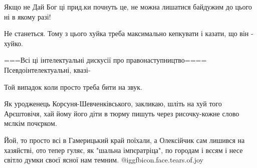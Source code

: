 \begin{itemize}
Якщо не Дай Бог ці прид.ки почнуть це, не можна лишатися байдужим до цього ні в якому разі!

 
Не станеться. Тому з цього хуйка треба максимально кепкувати і казати, що він - хуйко.

 
===Всі ці інтелектуальні дискусії про правонаступництво====
Псевдоінтелектуальні, квазі-

 

Той випадок коли просто треба бити на звук.

 

Як уродженець Корсуня-Шевченківського, закликаю, шліть на хуй того Арєштовічя,
хай йому його діти в тюрму пишуть через рисочку-кожне слово мєлкім почєрком.



Йой, то просто всі в Гамерицький край поїхали, а Олексійчик сам лишився на
хазяйстві, ото тепер гуляє, як "шальна імпєратріца", по городам і вєсям і несе
світло думки своєї ясної нам темним.  @igg{fbicon.face.tears.of.joy} 



\end{itemize}
